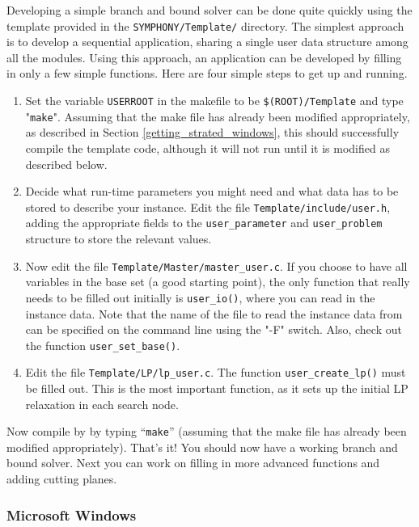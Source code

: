 Developing a simple branch and bound solver can be done quite quickly using
the template provided in the \texttt{SYMPHONY/Template/}
directory. The simplest approach is to develop a sequential application,
sharing a single user data structure among all the modules. Using this
approach, an application can be developed by filling in only a few simple
functions. Here are four simple steps to get up and running.
\begin{enumerate}

\item Set the variable \texttt{USERROOT} in the makefile to be
\texttt{\$(ROOT)/Template} and type "\texttt{make}". Assuming that the make
file has already been modified appropriately, as described in Section
\ref{getting_strated_windows}, this should successfully compile the template
code, although it will not run until it is modified as described below.

\item Decide what run-time parameters you might need and what data has 
to be stored to describe your instance. Edit the file
\texttt{Template/include/user.h}, adding the appropriate fields to the
\texttt{user\_parameter} and \texttt{user\_problem} structure to store the
relevant values.

\item Now edit the file \texttt{Template/Master/master\_user.c}. If you choose
to have all variables in the base set (a good starting point), the only
function that really needs to be filled out initially is \texttt{user\_io()},
where you can read in the instance data. Note that the name of the file to
read the instance data from can be specified on the command line using the
"-F" switch.  Also, check out the function
\texttt{user\_set\_base()}.

\item Edit the file \texttt{Template/LP/lp\_user.c}. The function
\texttt{user\_create\_lp()} must be filled out. This is the most important
function, as it sets up the initial LP relaxation in each search node.
\end{enumerate}

Now compile by by typing ``\texttt{make}'' (assuming that the make
file has already been modified appropriately). That's it! You should now have
a working branch and bound solver. Next you can work on filling in more
advanced functions and adding cutting planes.

\subsubsection{Microsoft Windows}

